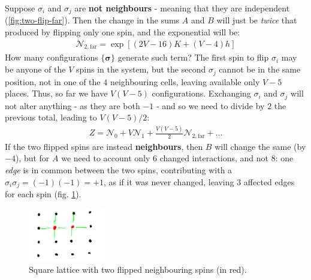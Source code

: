 \documentclass[../template.tex]{subfiles}
\begin{document}
Suppose $\sigma_i$ and $\sigma_j$ are \textbf{not neighbours}  - meaning that they are independent (\ref{fig:two-flip-far}). Then the change in the sums $A$ and $B$ will just be \textit{twice} that produced by flipping only one spin, and the exponential will be:
\begin{align}
    \mathcal{N}_{2,\mathrm{far}} = \exp\left[(2V -16)K + (V-4)h\right]
\end{align}
How many configurations $\{\bm{\sigma}\}$ generate such term? The first spin to flip $\sigma_i$ may be anyone of the $V$ spins in the system, but the second $\sigma_j$ cannot be in the same position, not in one of the $4$ neighbouring cells, leaving available only $V-5$ places. Thus, so far we have $V(V-5)$ configurations. Exchanging $\sigma_i$ and $\sigma_j$ will not alter anything - as they are both $-1$ - and so we need to divide by $2$ the previous total, leading to $V(V-5)/2$:
\begin{align*}
    Z = \mathcal{N}_0 + V \mathcal{N}_1 + \frac{V(V-5)}{2} \mathcal{N}_{2,\mathrm{far}} + \dots
\end{align*}
If the two flipped spins are instead \textbf{neighbours}, then $B$ will change the same (by $-4$), but for $A$ we need to account only $6$ changed interactions, and not $8$: one \textit{edge} is in common between the two spins, contributing with a $\sigma_i \sigma_j = (-1)(-1) = +1$, as if it was never changed, leaving $3$ affected edges for each spin (fig. \ref{fig:two-flip-close}).

\begin{figure}[H]
    \centering
    \includegraphics[width=0.3\textwidth]{image025.png}
    \caption{Square lattice with two flipped neighbouring spins (in red).\label{fig:two-flip-close}}
\end{figure}
\end{document}

